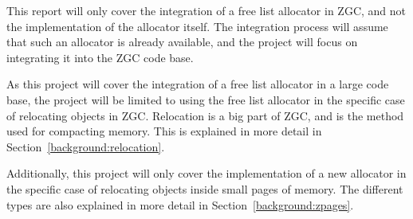 This report will only cover the integration of a free list allocator in ZGC, and not the implementation of the allocator itself. The integration process will assume that such an allocator is already available, and the project will focus on integrating it into the ZGC code base.

As this project will cover the integration of a free list allocator in a large code base, the project will be limited to using the free list allocator in the specific case of relocating objects in ZGC. Relocation is a big part of ZGC, and is the method used for compacting memory. This is explained in more detail in Section~\ref{background:relocation}. 

Additionally, this project will only cover the implementation of a new allocator in the specific case of relocating objects inside small pages of memory. The different types are also explained in more detail in Section~\ref{background:zpages}.